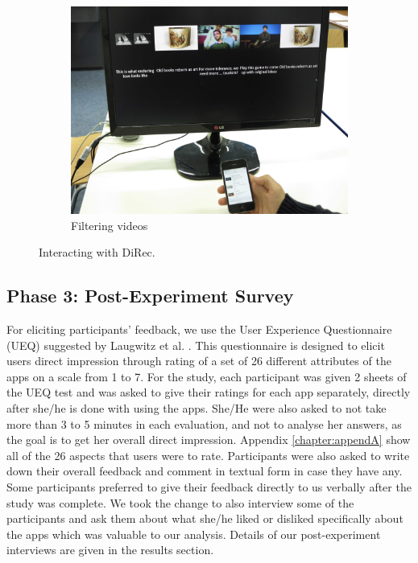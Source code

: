 \begin{figure}
    \begin{subfigure}[b]{0.3\textwidth}
        \includegraphics[width=\textwidth]{figures/IMG_6810}
        \caption{Filtering videos}
        \label{fig:figure52c}
    \end{subfigure}
   \caption{Interacting with DiRec.}\label{fig:figure52}
\end{figure}
 
\subsection{Phase 3: Post-Experiment Survey}
For eliciting participants' feedback, we use the User Experience Questionnaire
(UEQ) suggested by Laugwitz et al.
\cite{laugwitz2008construction}. This questionnaire is designed to elicit users
direct impression through rating of a set of 26 different attributes of the
apps on a scale from 1 to 7. For the study, each participant was given 2
sheets of the UEQ test and was asked to give their ratings for each app
separately, directly after she/he is done with using the apps. She/He were also
asked to not take more than 3 to 5 minutes in each evaluation, and not to analyse her
answers, as the goal is to get her overall direct impression. Appendix \ref{chapter:appendA}
show all of the 26 aspects that users were to rate. Participants were also asked
to write down their overall feedback and comment in textual form in case they
have any. Some participants preferred to give their feedback directly to us
verbally after the study was complete. We took the change to also interview some
of the participants and ask them about what she/he liked or disliked
specifically about the apps which was valuable to our analysis. Details of our
post-experiment interviews are given in the results section.

